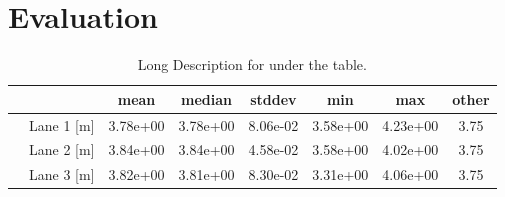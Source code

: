 
\chapter{Evaluation}
\label{sec:evaluation}

\begin{table}[!htbp]
    \centering
    \begin{tabular}{crSSSSSS}
        \hline
        & & \textbf{mean} & \textbf{median} & \textbf{stddev} & \textbf{min} & \textbf{max} & \textbf{other}\\%
        \hline
        \parbox[t]{2mm}{}
        & Lane 1 [m] & 3.78e+00 & 3.78e+00 & 8.06e-02 & 3.58e+00 & 4.23e+00 & 3.75\\
        & Lane 2 [m] & 3.84e+00 & 3.84e+00 & 4.58e-02 & 3.58e+00 & 4.02e+00 & 3.75\\
        & Lane 3 [m] & 3.82e+00 & 3.81e+00 & 8.30e-02 & 3.31e+00 & 4.06e+00 & 3.75\\
        \hline
    \end{tabular}
    \caption[Short Description for List of Tables]{
      Long Description for under the table.
    }\label{tab:xy}
\end{table}

\blindtext
